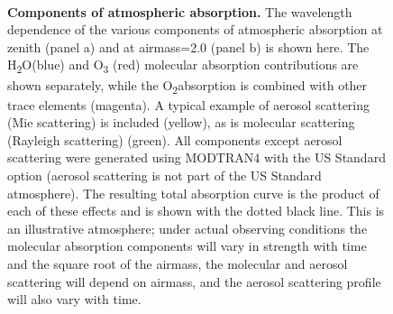 \documentclass[12pt,preprint]{aastex}
\newcommand{\water}   {H\textsubscript{2}O}
\newcommand{\ozone}    {O\textsubscript{3}}
\newcommand{\oxy}     {O\textsubscript{2}}
\begin{document}
\begin{figure}[htpb]
\centering
{}\\
\vspace{-15pt}
\caption{{\small
{\bf Components of atmospheric absorption.} The wavelength dependence
of the various components of atmospheric absorption at zenith (panel
a) and at airmass=2.0 (panel b) is shown here.  The \water (blue) and \ozone
(red) molecular absorption contributions are shown separately,
while the \oxy absorption is combined with other trace elements (magenta). A
typical example of aerosol scattering (Mie scattering) is included
(yellow), as is molecular scattering (Rayleigh scattering)
(green). All components except aerosol scattering were generated using
MODTRAN4 with the US Standard option (aerosol scattering is not part of the US 
Standard atmosphere). The resulting total absorption curve is the product of each
of these effects and is shown with the dotted black line. This is an
illustrative atmosphere; under actual observing conditions the
molecular absorption components will vary in strength with time and
the square root of the airmass, the molecular and aerosol scattering
will depend on airmass, and the aerosol scattering profile will also 
vary with time.}}
\label{fig:absorption_comps}
\end{figure}
\end{document}
